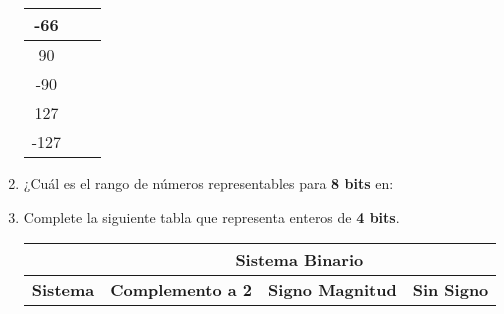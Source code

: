 \documentclass[12pt]{article}
\begin{document}
\begin{enumerate}
\begin{center}
\begin{tabular}[t]{|c|c|c|}
        \hline

            -66&&\\

        \hline

            90&&\\

        \hline

            -90&&\\

        \hline

            127&&\\

        \hline

            -127&&\\

        \hline

        \end{tabular}

    \end{center}

    \item ¿Cuál es el rango de números representables para \textbf{8 bits} en:


    \item Complete la siguiente tabla que representa enteros de \textbf{4
        bits}.

        \begin{center}

            \begin{tabular}[t]{|c|c|c|c|}

            \hline

                &\multicolumn{3}{|c|}{\textbf{Sistema Binario}}\\

            \hline

                \textbf{Sistema} & \textbf{Complemento a 2}& \textbf{Signo
                Magnitud} & \textbf{Sin Signo}\\


\end{tabular}
\end{center}
\end{enumerate}
\end{document}
